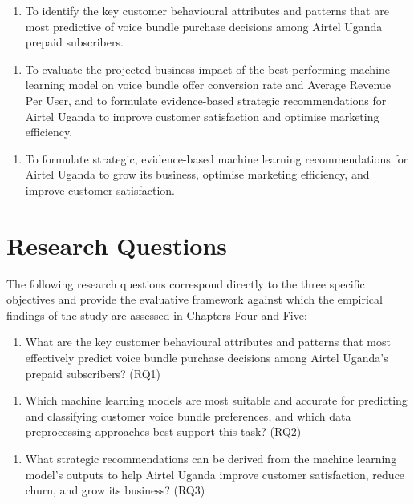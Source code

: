 \begin{enumerate}
\item To identify the key customer behavioural attributes and patterns that are most predictive of voice bundle purchase decisions among Airtel Uganda prepaid subscribers.
\end{enumerate}
\begin{enumerate}
\item To evaluate the projected business impact of the best-performing machine learning model on voice bundle offer conversion rate and Average Revenue Per User, and to formulate evidence-based strategic recommendations for Airtel Uganda to improve customer satisfaction and optimise marketing efficiency.
\end{enumerate}
\begin{enumerate}
\item To formulate strategic, evidence-based machine learning recommendations for Airtel Uganda to grow its business, optimise marketing efficiency, and improve customer satisfaction.
\end{enumerate}

\section{Research Questions}

The following research questions correspond directly to the three specific objectives and provide the evaluative framework against which the empirical findings of the study are assessed in Chapters Four and Five:

\begin{enumerate}
\item What are the key customer behavioural attributes and patterns that most effectively predict voice bundle purchase decisions among Airtel Uganda's prepaid subscribers? (RQ1)
\end{enumerate}
\begin{enumerate}
\item Which machine learning models are most suitable and accurate for predicting and classifying customer voice bundle preferences, and which data preprocessing approaches best support this task? (RQ2)
\end{enumerate}
\begin{enumerate}
\item What strategic recommendations can be derived from the machine learning model's outputs to help Airtel Uganda improve customer satisfaction, reduce churn, and grow its business? (RQ3)
\end{enumerate}

